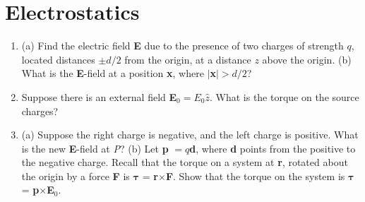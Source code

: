 \documentclass[10pt]{article}
\begin{document}
\maketitle

\section{Electrostatics}

\begin{enumerate}
\item (a) Find the electric field \textbf{E} due to the presence of two charges of strength $q$, located distances $\pm d/2$ from the origin, at a distance $z$ above the origin. (b) What is the \textbf{E}-field at a position \textbf{x}, where $|$\textbf{x}$| > d/2$? \\ \vspace{5cm}
\item Suppose there is an external field \textbf{E}$_0 = E_0 \hat{z}$.  What is the torque on the source charges? \\ \vspace{2cm}
\item (a) Suppose the right charge is negative, and the left charge is positive.  What is the new \textbf{E}-field at \textit{P}? (b) Let \textbf{p} $= q$\textbf{d}, where \textbf{d} points from the positive to the negative charge.  Recall that the torque on a system at \textbf{r}, rotated about the origin by a force \textbf{F} is $\bm{\tau}$ = \textbf{r}$ \times $\textbf{F}.  Show that the torque on the system is $\bm{\tau}$ = \textbf{p}$ \times $\textbf{E}$_0$.
\end{enumerate}
\end{document}
